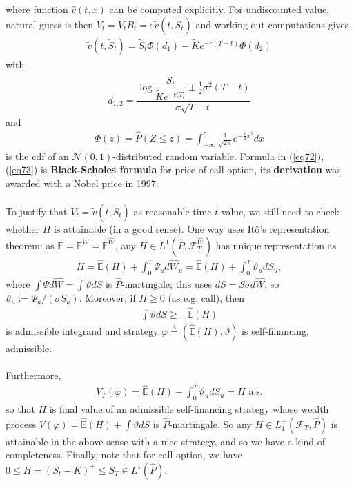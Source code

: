 \documentclass[12pt,a4paper, twoside]{article}
\theoremstyle{definition}
\newcommand{\EE}{\mathbb{E}} %
\newcommand{\teq}{\overset{\wedge}{=}}
\begin{document}
where function $\widehat{v}(t,x)$ can be computed explicitly. For undiscounted value, natural guess is then  $\widetilde{V}_t = \widehat{V}_t \widetilde{B}_t =: \widetilde{v}(t, \widetilde{S}_t)$ and working out computations gives 
\begin{align*} \label{eq72}
\widetilde{v}(t, \widetilde{S}_t) = \widetilde{S}_t \Phi(d_1) - \widetilde{K}e^{-r(T-t)} \Phi(d_2) \tag{7.2}
\end{align*}
with
\begin{align*} \label{eq73}
d_{1,2} = \dfrac{\log \dfrac{\widetilde{S}_t}{\widetilde{K}e^{-r(T_t}} \pm \frac{1}{2}\sigma^2(T-t)}{\sigma \sqrt{T-t}} \tag{7.3}
\end{align*}
and 
\begin{align*}
\Phi(z) = \widehat{P}( Z \leq z ) = \int_{- \infty}^z \frac{1}{\sqrt{2 \pi}}e^{- \frac{1}{2}x^2}dx
\end{align*}
is the cdf of an $\mathcal{N}(0,1)$-distributed random variable. Formula in (\ref{eq72}), (\ref{eq73}) is \textbf{Black-Scholes formula} for price of call option, its \textbf{derivation} was awarded with a Nobel price in 1997. 
\\\\
To justify that $\widetilde{V}_t= \widetilde{v}(t, \widetilde{S}_t)$ as reasonable time-$t$ value, we still need to check whether $H$ is attainable (in a good sense). 
\newpage
One way uses Itô's representation theorem: as $\mathbb{F}= \mathbb{F}^W = \mathbb{F}^{\widehat{W}}$, any $H \in L^1( \widehat{P}, \mathcal{F}_T^{\widehat{W}})$ has unique representation as 
\begin{align*}
H = \widehat{\EE}(H) + \int_0^T \Psi_u d \widehat{W}_u = \widehat{\EE}(H) + \int_0^T \vartheta_u d S_u,
\end{align*}
where $\int \Psi d \widehat{W} = \int \vartheta dS$ is $\widehat{P}$-martingale; this uses $dS= S \sigma d \widehat{W}$, so $\vartheta_u := \Psi_u/ (\sigma S_u)$. Moreover, if $H \geq 0$ (as e.g. call), then 
\begin{align*}
\int \vartheta dS \geq - \widehat{\EE}(H)
\end{align*}
is admissible integrand and strategy $\varphi \teq ( \widehat{\EE}(H), \vartheta)$ is self-financing, admissible. \\
\\
Furthermore, \begin{align*}
V_T( \varphi)= \widehat{\EE}(H) + \int_0^T \vartheta_u dS_u = H \text{ a.s.}
\end{align*}
so that $H$ is final value of an admissible self-financing strategy whose wealth process $V( \varphi) = \widehat{\EE}(H) + \int \vartheta dS$ is $\widehat{P}$-martingale. So any $H \in L_1^+( \mathcal{F}_T, \widehat{P})$ is attainable in the above sense with a nice strategy, and so we have a kind of completeness. Finally,  note that for call option, we have $0 \leq H = (S_t-K)^+ \leq S_T \in L^1( \widehat{P})$. \\
\end{document}
